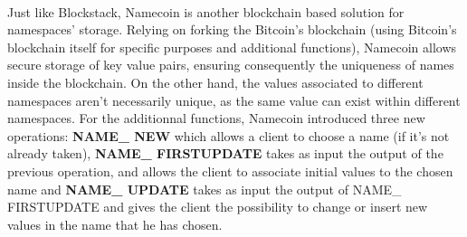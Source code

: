 \\
Just like Blockstack, Namecoin is another blockchain based solution for namespaces' storage. Relying on forking the Bitcoin's blockchain (using Bitcoin's blockchain itself for specific purposes and additional functions), Namecoin allows secure storage of key value pairs, ensuring consequently the uniqueness of names inside the blockchain. On the other hand, the values associated to different namespaces aren't necessarily unique, as the same value can exist within different namespaces. For the additionnal functions, Namecoin introduced three new operations: \textbf{NAME\_ NEW} which allows a client to choose a name (if it's not already taken), \textbf{NAME\_ FIRSTUPDATE} takes as input the output of the previous operation, and allows the client to associate initial values to the chosen name and \textbf{NAME\_ UPDATE}  takes as input the output of NAME\_ FIRSTUPDATE and gives the client the possibility to change or insert new values in the name that he has chosen.







